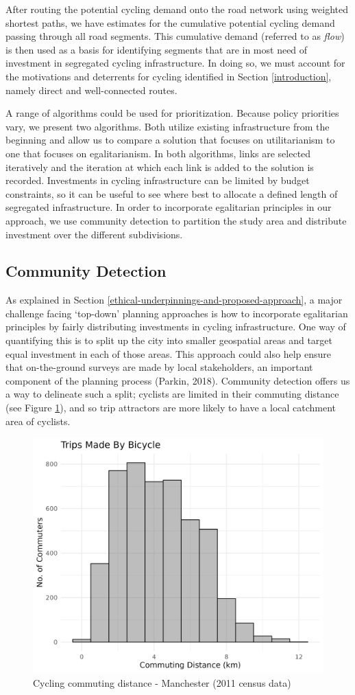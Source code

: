 \documentclass[
]{article}
\begin{document}
After routing the potential cycling demand onto the road network using
weighted shortest paths, we have estimates for the cumulative potential
cycling demand passing through all road segments. This cumulative demand
(referred to as \emph{flow}) is then used as a basis for identifying segments
that are in most need of investment in segregated cycling
infrastructure. In doing so, we must account for the motivations and
deterrents for cycling identified in Section \ref{introduction}, namely
direct and well-connected routes.

A range of algorithms could be used for prioritization. Because policy
priorities vary, we present two algorithms. Both utilize existing
infrastructure from the beginning and allow us to compare a solution
that focuses on utilitarianism to one that focuses on egalitarianism. In
both algorithms, links are selected iteratively and the iteration at
which each link is added to the solution is recorded. Investments in
cycling infrastructure can be limited by budget constraints, so it can
be useful to see where best to allocate a defined length of segregated
infrastructure. In order to incorporate egalitarian principles in our
approach, we use community detection to partition the study area and
distribute investment over the different subdivisions.

\hypertarget{community-detection}{%
\subsection{Community Detection}\label{community-detection}}

As explained in Section
\ref{ethical-underpinnings-and-proposed-approach}, a major challenge
facing `top-down' planning approaches is how to incorporate egalitarian
principles by fairly distributing investments in cycling infrastructure.
One way of quantifying this is to split up the city into smaller
geospatial areas and target equal investment in each of those areas.
This approach could also help ensure that on-the-ground surveys are made
by local stakeholders, an important component of the planning process
(Parkin, 2018). Community detection offers us a way to
delineate such a split; cyclists are limited in their commuting distance
(see Figure \ref{fig:cyclinghistmanc}), and so trip attractors are more
likely to have a local catchment area of cyclists.

\begin{figure}

{\centering \includegraphics[width=0.4\linewidth]{data/Manchester/Plots/histogram_distance_cycling} 

}

\caption{Cycling commuting distance - Manchester (2011 census data)}\label{fig:cyclinghistmanc}
\end{figure}
\end{document}
